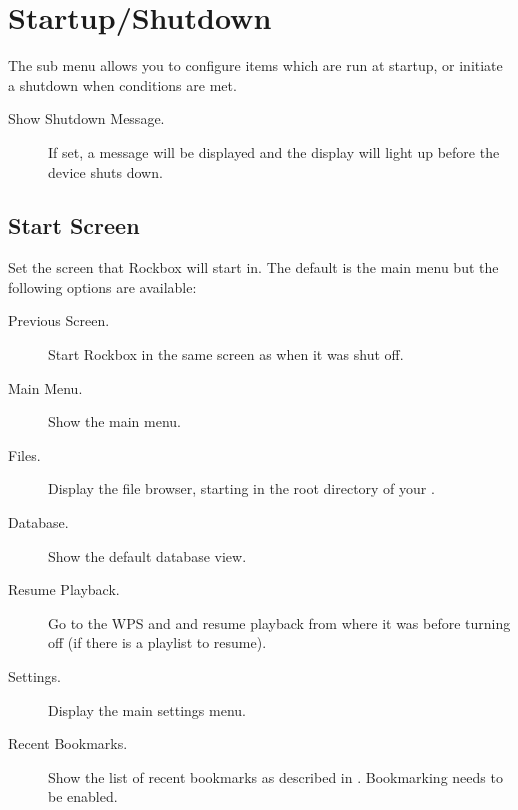 
\section{\label{ref:StartupShutdownOptions}Startup/Shutdown}

The  sub menu allows you to configure items which
are run at startup, or initiate a shutdown when conditions are met.

\begin{description}
    \item[Show Shutdown Message.] If set, a message will be displayed and the display
    will light up before the device shuts down.
\end{description}

\subsection{Start Screen}
  Set the screen that Rockbox will start in. The default is the main menu but
  the following options are available:
  \begin{description}
    \item[Previous Screen.] Start Rockbox in the same screen as when it was
    shut off.
    \item[Main Menu.] Show the main menu.
    \item[Files.] Display the file browser, starting in the root directory of
    your \dap.
    \item[Database.] Show the default database view.
    \item[Resume Playback.] Go to the WPS and and resume playback from where
    it was before turning off (if there is a playlist to resume).
    \item[Settings.] Display the main settings menu.
    \item[Recent Bookmarks.] Show the list of recent bookmarks as
      described in . Bookmarking needs
      to be enabled.
  \end{description}

